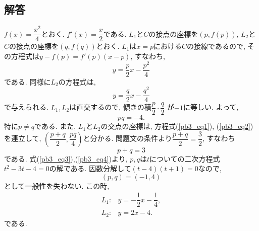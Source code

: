 \documentclass[dvipdfmx,a4paper]{jsarticle}
\newcommand{\2}{I\hspace{-1pt}I}
\newcommand{\3}{I\hspace{-1pt}I\hspace{-1pt}I}
\begin{document}
    \subsection{解答}
    $f(x) = \dfrac{x^2}{4}$とおく. $f'(x) = \dfrac{x}{2}$である. 
    $L_1$と$C$の接点の座標を$(p, f(p))$, $L_2$と$C$の接点の座標を$(q, f(q))$とおく. 
    $L_1$は$x=p$における$C$の接線であるので, その方程式は$y-f(p) = f'(p)(x-p)$, すなわち, 
    \begin{equation} \label{pb3_eq1}
        y = \dfrac{p}{2} x - \dfrac{p^2}{4}
    \end{equation}
    である. 同様に$L_2$の方程式は, 
    \begin{equation} \label{pb3_eq2}
        y = \dfrac{q}{2} x - \dfrac{q^2}{4}
    \end{equation}
    で与えられる. $L_1, L_2$は直交するので, 傾きの積$\dfrac{p}{2} \cdot \dfrac{q}{2}$
    が$-1$に等しい. よって, 
    \begin{equation} \label{pb3_eq3}
        pq = -4.
    \end{equation}
    特に$p \neq q$である. 
    また, $L_1$と$L_2$の交点の座標は, 方程式(\ref{pb3_eq1}), (\ref{pb3_eq2})を連立して, 
    $\left(\dfrac{p+q}{2}, \dfrac{pq}{4}\right)$と分かる. 
    問題文の条件より$\dfrac{p+q}{2} = \dfrac{3}{2}$, すなわち
    \begin{equation} \label{pb3_eq4}
        p + q = 3
    \end{equation}
    である. 式(\ref{pb3_eq3}),(\ref{pb3_eq4})より, $p,q$は$t$についての二次方程式
    $t^2 -3t -4 = 0$の解である. 因数分解して$(t-4)(t+1)=0$なので, 
    \begin{equation*}
        (p,q) = (-1, 4)
    \end{equation*}
    として一般性を失わない. この時, 
    \begin{align*}
        L_1 :& y =  -\dfrac{1}{2} x - \dfrac{1}{4}, \\
        L_2 :& y =  2 x - 4.
    \end{align*}
    である. 
\end{document}
